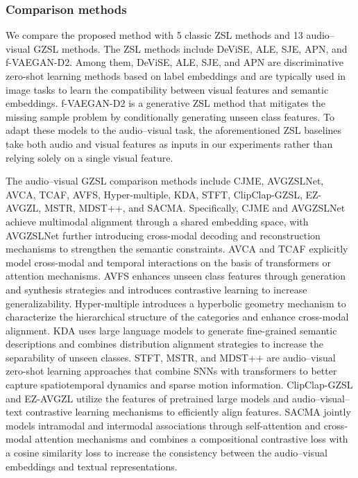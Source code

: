 \documentclass[lettersize,journal]{IEEEtran}
\begin{document}
\subsubsection{Comparison methods}
We compare the proposed method with 5 classic ZSL methods and 13 audio–visual GZSL methods. The ZSL methods include DeViSE\cite{38}, ALE\cite{39}, SJE\cite{40}, APN\cite{41}, and f-VAEGAN-D2\cite{42}. Among them, DeViSE, ALE, SJE, and APN are discriminative zero-shot learning methods based on label embeddings and are typically used in image tasks to learn the compatibility between visual features and semantic embeddings. f-VAEGAN-D2 is a generative ZSL method that mitigates the missing sample problem by conditionally generating unseen class features. To adapt these models to the audio–visual task, the aforementioned ZSL baselines take both audio and visual features as inputs in our experiments rather than relying solely on a single visual feature.


The audio–visual GZSL comparison methods include CJME\cite{3}, AVGZSLNet\cite{4}, AVCA\cite{1}, TCAF\cite{5}, AVFS\cite{6}, Hyper-multiple\cite{7}, KDA\cite{9}, STFT\cite{43}, ClipClap-GZSL\cite{2}, EZ-AVGZL\cite{12}, MSTR\cite{14}, MDST++\cite{44}, and SACMA\cite{45}. Specifically, CJME and AVGZSLNet achieve multimodal alignment through a shared embedding space, with AVGZSLNet further introducing cross-modal decoding and reconstruction mechanisms to strengthen the semantic constraints. AVCA and TCAF explicitly model cross-modal and temporal interactions on the basis of transformers or attention mechanisms. AVFS enhances unseen class features through generation and synthesis strategies and introduces contrastive learning to increase generalizability. Hyper-multiple introduces a hyperbolic geometry mechanism to characterize the hierarchical structure of the categories and enhance cross-modal alignment. KDA uses large language models to generate fine-grained semantic descriptions and combines distribution alignment strategies to increase the separability of unseen classes. STFT, MSTR, and MDST++ are audio–visual zero-shot learning approaches that combine SNNs with transformers to better capture spatiotemporal dynamics and sparse motion information. ClipClap-GZSL and EZ-AVGZL utilize the features of pretrained large models and audio–visual–text contrastive learning mechanisms to efficiently align features. SACMA jointly models intramodal and intermodal associations through self-attention and cross-modal attention mechanisms and combines a compositional contrastive loss with a cosine similarity loss to increase the consistency between the audio–visual embeddings and textual representations.
\end{document}
